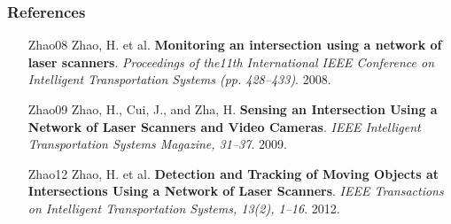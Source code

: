 \documentclass[table]{beamer}
\begin{document}
\frame
{
	\frametitle{References}
		\footnotesize{
	\begin{itemize}[leftmargin=.6in]
		\item [Zhao08] Zhao, H. et al.\textbf{ Monitoring an intersection using a network of laser scanners}. \textit{Proceedings of the11th International IEEE Conference on Intelligent Transportation Systems (pp. 428–433)}. 2008.
		\item [Zhao09] Zhao, H., Cui, J., and Zha, H. \textbf{Sensing an Intersection Using a Network of Laser Scanners and Video Cameras}. \textit{IEEE Intelligent Transportation Systems Magazine, 31–37}. 2009.
		\item [Zhao12] Zhao, H. et al. \textbf{Detection and Tracking of Moving Objects at Intersections Using a Network of Laser Scanners}. \textit{IEEE Transactions on Intelligent Transportation Systems, 13(2), 1–16}. 2012.

	\end{itemize}	
	}
}

%
%



%
%
%

%
%
%
%
\end{document}
